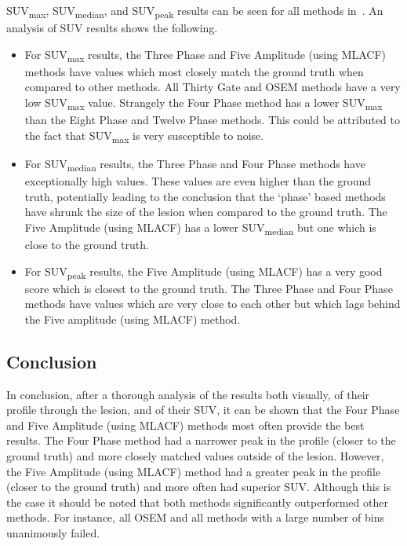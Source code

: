             \gls{SUV}\textsubscript{max}, \gls{SUV}\textsubscript{median}, and \gls{SUV}\textsubscript{peak} results can be seen for all methods in~. An analysis of \gls{SUV} results shows the following.

            \begin{itemize}
                \item For \gls{SUV}\textsubscript{max} results, the Three Phase and Five Amplitude (using \gls{MLACF}) methods have values which most closely match the ground truth when compared to other methods. All Thirty Gate and \gls{OSEM} methods have a very low \gls{SUV}\textsubscript{max} value. Strangely the Four Phase method has a lower \gls{SUV}\textsubscript{max} than the Eight Phase and Twelve Phase methods. This could be attributed to the fact that \gls{SUV}\textsubscript{max} is very susceptible to noise.

                \item For \gls{SUV}\textsubscript{median} results, the Three Phase and Four Phase methods have exceptionally high values. These values are even higher than the ground truth, potentially leading to the conclusion that the `phase' based methods have shrunk the size of the lesion when compared to the ground truth. The Five Amplitude (using \gls{MLACF}) has a lower \gls{SUV}\textsubscript{median} but one which is close to the ground truth.

                \item For \gls{SUV}\textsubscript{peak} results, the Five Amplitude (using \gls{MLACF}) has a very good score which is closest to the ground truth. The Three Phase and Four Phase methods have values which are very close to each other but which lags behind the Five amplitude (using \gls{MLACF}) method.
            \end{itemize}

        \subsection{Conclusion} \label{sec:evaluation_of_pet_ct_motion_correction_incorporating_motion_models_using_mlacf_and_complex_gating_schemes_conclusion}
            In conclusion, after a thorough analysis of the results both visually, of their profile through the lesion, and of their \gls{SUV}, it can be shown that the Four Phase and Five Amplitude (using \gls{MLACF}) methods most often provide the best results. The Four Phase method had a narrower peak in the profile (closer to the ground truth) and more closely matched values outside of the lesion. However, the Five Amplitude (using \gls{MLACF}) method had a greater peak in the profile (closer to the ground truth) and more often had superior \gls{SUV}. Although this is the case it should be noted that both methods significantly outperformed other methods. For instance, all \gls{OSEM} and all methods with a large number of bins unanimously failed.
            
